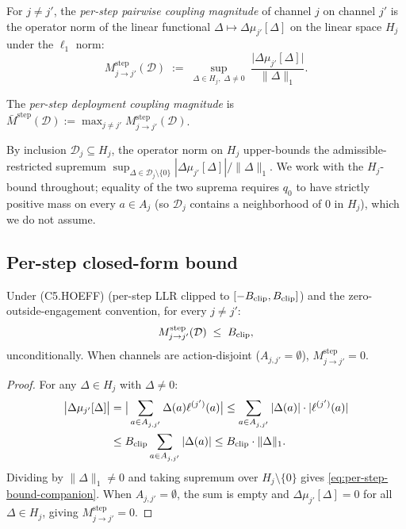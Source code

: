 \begin{definition}
\label{def:M-step}
For $j \neq j'$, the \emph{per-step pairwise coupling magnitude}
of channel $j$ on channel $j'$ is the operator norm of the linear
functional $\Delta \mapsto \Delta\mu_{j'}[\Delta]$ on the linear
space $H_j$ under the $\ell_1$ norm:
\begin{equation}
\label{eq:M-step-def}
  M_{j \to j'}^{\mathrm{step}}(\mathcal{D})
  \;:=\; \sup_{\Delta \in H_j,\; \Delta \neq 0}
  \;\frac{\big| \Delta\mu_{j'}[\Delta] \big|}{\|\Delta\|_1}.
\end{equation}

The \emph{per-step deployment coupling magnitude} is
$\bar{M}^{\mathrm{step}}(\mathcal{D}) := \max_{j \neq j'}
M_{j \to j'}^{\mathrm{step}}(\mathcal{D})$.
\end{definition}

By inclusion $\mathcal{D}_j \subseteq H_j$, the operator norm on
$H_j$ upper-bounds the admissible-restricted supremum
$\sup_{\Delta \in \mathcal{D}_j \setminus \{0\}}
|\Delta\mu_{j'}[\Delta]|/\|\Delta\|_1$. We work with the
$H_j$-bound throughout; equality of the two suprema requires
$q_0$ to have strictly positive mass on every $a \in A_j$ (so
$\mathcal{D}_j$ contains a neighborhood of $0$ in $H_j$), which
we do not assume.

\subsection{Per-step closed-form bound}

\begin{lemma}
\label{lem:per-step-companion}
Under (C5.HOEFF) (per-step LLR clipped to $[-B_{\mathrm{clip}}, B_{\mathrm{clip}}]$) and
the zero-outside-engagement convention, for every $j \neq j'$:
\begin{equation}
\label{eq:per-step-bound-companion}
  M_{j \to j'}^{\mathrm{step}}(\mathcal{D}) \;\leq\; B_{\mathrm{clip}},
\end{equation}
unconditionally. When channels are action-disjoint
($A_{j, j'} = \emptyset$), $M_{j \to j'}^{\mathrm{step}} = 0$.
\end{lemma}

\begin{proof}
For any $\Delta \in H_j$ with $\Delta \neq 0$:
\begin{align*}
  \big| \Delta\mu_{j'}[\Delta] \big|
  &= \big| \sum_{a \in A_{j, j'}} \Delta(a) \ell^{(j')}(a) \big|
  \leq \sum_{a \in A_{j, j'}} |\Delta(a)| \cdot |\ell^{(j')}(a)|
  \\ &\leq B_{\mathrm{clip}} \sum_{a \in A_{j, j'}} |\Delta(a)|
  \leq B_{\mathrm{clip}} \cdot \|\Delta\|_1.
\end{align*}
Dividing by $\|\Delta\|_1 \neq 0$ and taking supremum over $H_j
\setminus \{0\}$ gives \eqref{eq:per-step-bound-companion}. When
$A_{j, j'} = \emptyset$, the sum is empty and
$\Delta\mu_{j'}[\Delta] = 0$ for all $\Delta \in H_j$, giving
$M_{j \to j'}^{\mathrm{step}} = 0$.
\end{proof}

